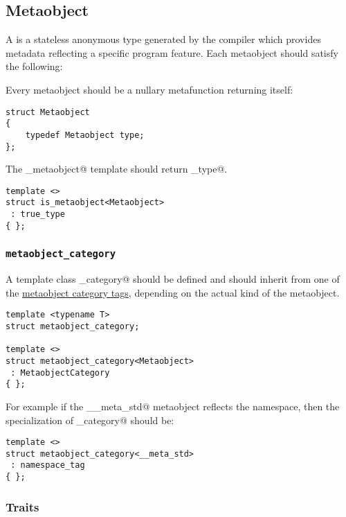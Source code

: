 \subsection{Metaobject}
\label{concept-Metaobject}


A  is a stateless anonymous type generated by the compiler which
provides metadata reflecting a specific program feature. Each metaobject
should satisfy the following:

Every metaobject should be a nullary metafunction returning itself:

\begin{lstlisting}
struct Metaobject
{
	typedef Metaobject type;
};
\end{lstlisting}

The \verb@is_metaobject@ template should return \verb@true_type@.

\begin{lstlisting}
template <>
struct is_metaobject<Metaobject>
 : true_type
{ };
\end{lstlisting}

\subsubsection{\texttt{metaobject\_category}}

A template class \verb@metaobject_category@ should be defined and should inherit from
one of the \hyperref[metaobject-category-tags]{metaobject category tags}, depending on
the actual kind of the metaobject.

\begin{lstlisting}
template <typename T>
struct metaobject_category;

template <>
struct metaobject_category<Metaobject>
 : MetaobjectCategory
{ };
\end{lstlisting}

For example if the \verb@__meta_std@ metaobject reflects the \verb@std@ namespace,
then the specialization of \verb@metaobject_category@ should be:

\begin{lstlisting}
template <>
struct metaobject_category<__meta_std>
 : namespace_tag
{ };
\end{lstlisting}

\subsubsection{Traits}

